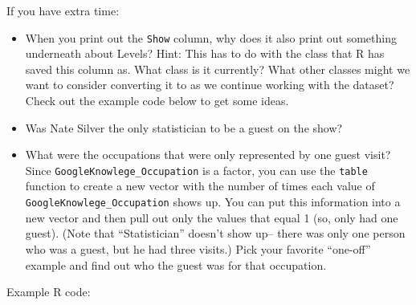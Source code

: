 \documentclass[]{book}
\makeatletter
\newenvironment{Shaded}{\begin{snugshade}}{\end{snugshade}}
\newcommand{\KeywordTok}[1]{\textcolor[rgb]{0.13,0.29,0.53}{\textbf{#1}}}
\newcommand{\DataTypeTok}[1]{\textcolor[rgb]{0.13,0.29,0.53}{#1}}
\newcommand{\StringTok}[1]{\textcolor[rgb]{0.31,0.60,0.02}{#1}}
\newcommand{\CommentTok}[1]{\textcolor[rgb]{0.56,0.35,0.01}{\textit{#1}}}
\newcommand{\OperatorTok}[1]{\textcolor[rgb]{0.81,0.36,0.00}{\textbf{#1}}}
\newcommand{\NormalTok}[1]{#1}
\providecommand{\tightlist}{%
  \setlength{\itemsep}{0pt}\setlength{\parskip}{0pt}}
\newenvironment{kframe}{%
\medskip{}
\setlength{\fboxsep}{.8em}
 \def\at@end@of@kframe{}%
 \ifinner\ifhmode%
  \def\at@end@of@kframe{\end{minipage}}%
  \begin{minipage}{\columnwidth}%
 \fi\fi%
 \def\FrameCommand##1{\hskip\@totalleftmargin \hskip-\fboxsep
 \colorbox{shadecolor}{##1}\hskip-\fboxsep
     \hskip-\linewidth \hskip-\@totalleftmargin \hskip\columnwidth}%
 \MakeFramed {\advance\hsize-\width
   \@totalleftmargin\z@ \linewidth\hsize
   \@setminipage}}%
 {\par\unskip\endMakeFramed%
 \at@end@of@kframe}
\renewenvironment{Shaded}{\begin{kframe}}{\end{kframe}}
\theoremstyle{definition}
\theoremstyle{definition}
\theoremstyle{definition}
\theoremstyle{remark}
\makeatother
\begin{document}
If you have extra time:

\begin{itemize}
\tightlist
\item
  When you print out the \texttt{Show} column, why does it also print
  out something underneath about Levels? Hint: This has to do with the
  class that R has saved this column as. What class is it currently?
  What other classes might we want to consider converting it to as we
  continue working with the dataset? Check out the example code below to
  get some ideas.
\item
  Was Nate Silver the only statistician to be a guest on the show?
\item
  What were the occupations that were only represented by one guest
  visit? Since \texttt{GoogleKnowlege\_Occupation} is a factor, you can
  use the \texttt{table} function to create a new vector with the number
  of times each value of \texttt{GoogleKnowlege\_Occupation} shows up.
  You can put this information into a new vector and then pull out only
  the values that equal 1 (so, only had one guest). (Note that
  ``Statistician'' doesn't show up-- there was only one person who was a
  guest, but he had three visits.) Pick your favorite ``one-off''
  example and find out who the guest was for that occupation.
\end{itemize}

Example R code:

\begin{Shaded}
\end{Shaded}

\begin{Shaded}
\end{Shaded}

\begin{Shaded}
\end{Shaded}
\end{document}
